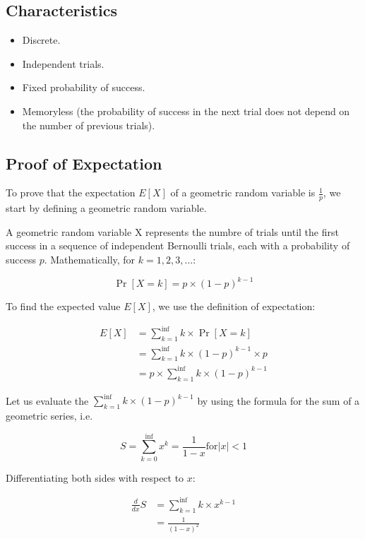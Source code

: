     \subsection*{Characteristics}
        \begin{itemize}
            \item Discrete.
            \item Independent trials.
            \item Fixed probability of success.
            \item Memoryless (the probability of success in the next trial does not depend on the number of previous trials).
        \end{itemize}

    \subsection*{Proof of Expectation}
        To prove that the expectation \(E[X]\) of a geometric random variable is \(\frac{1}{p}\), we start by defining a geometric random variable.

        A geometric random variable X represents the numbre of trials until the first success in a sequence of independent Bernoulli trials, each with a probability of success \(p\). Mathematically, for \(k = 1, 2, 3, \dots\):

        \[
            \Pr[X = k] = p \times (1 - p)^{k - 1}
        \]

        To find the expected value \(E[X]\), we use the definition of expectation:

        \[
            \begin{aligned}
                E[X] & = \sum_{k = 1}^{\inf} k \times \Pr[X = k]\\
                & = \sum_{k = 1}^{\inf} k \times (1 - p)^{k - 1} \times p\\
                & = p \times \sum_{k = 1}^{\inf} k \times (1 - p)^{k - 1}
            \end{aligned}
        \]

        Let us evaluate the \(\sum_{k = 1}^{\inf} k \times (1 - p)^{k - 1}\) by using the formula for the sum of a geometric series, i.e.

        \[
            S = \sum_{k = 0}^{\inf} x^k = \frac{1}{1 - x} \text{for} |x| < 1
        \]

        Differentiating both sides with respect to \(x\):

        \[
            \begin{aligned}
                \frac{d}{dx}S & = \sum_{k = 1}^{\inf} k \times x^{k - 1}\\
                & = \frac{1}{(1 - x)^2}
            \end{aligned}
        \]

